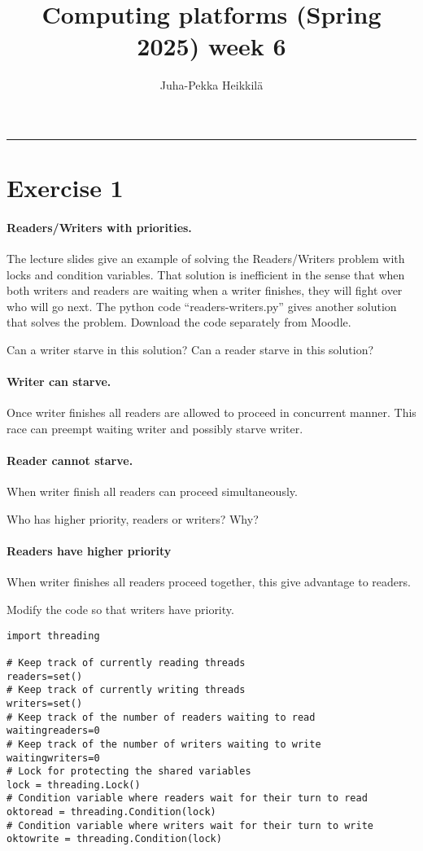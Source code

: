 \documentclass{article}
\title{Computing platforms (Spring 2025)\newline
week 6}
\author{Juha-Pekka Heikkilä}
\renewcommand{\maketitle}{%
  \begin{leftmark}
    \vspace*{\baselineskip} %



    \textbf{\fontsize{18}{36}\selectfont \thetitle} %

     \vspace{0.05cm} %
    \vspace{\baselineskip} %
     \rule{\textwidth}{0.4pt} %

   \end{leftmark}
}
\newcommand{\exercise}[1]{
    \section*{Exercise #1}
    \markboth{Exercise #1}{}
}
\begin{document}
\maketitle


\exercise{1}
\paragraph{Readers/Writers with priorities.} The lecture slides
give an example of solving the Readers/Writers problem with locks
and condition variables. That solution is inefficient in the sense
that when both writers and readers are waiting when a writer finishes,
they will fight over who will go next. The python code
“readers-writers.py” gives another solution that solves the problem.
Download the code separately from Moodle.

\begin{enumerate}[label=\textbf{\makebox[1cm][l]{\Huge\text{(\stylishfont\alph*)}}}, leftmargin=!, labelindent=0pt]
    \item Can a writer starve in this solution? Can a reader
    starve in this solution?
    \paragraph{Writer can starve.} Once writer finishes all readers are allowed to proceed
    in concurrent manner. This race can preempt waiting writer and
    possibly starve writer.
    \paragraph{Reader cannot starve.} When writer finish all readers can
    proceed simultaneously.

    \item Who has higher priority, readers or writers? Why?
    \paragraph{Readers have higher priority} When writer finishes all
    readers proceed together, this give advantage to readers.
    
    \item Modify the code so that writers have priority.
    \begin{lstlisting}
import threading

# Keep track of currently reading threads
readers=set()
# Keep track of currently writing threads
writers=set()
# Keep track of the number of readers waiting to read
waitingreaders=0
# Keep track of the number of writers waiting to write
waitingwriters=0
# Lock for protecting the shared variables
lock = threading.Lock()
# Condition variable where readers wait for their turn to read
oktoread = threading.Condition(lock)
# Condition variable where writers wait for their turn to write
oktowrite = threading.Condition(lock)


\end{lstlisting}
\end{enumerate}
\end{document}
